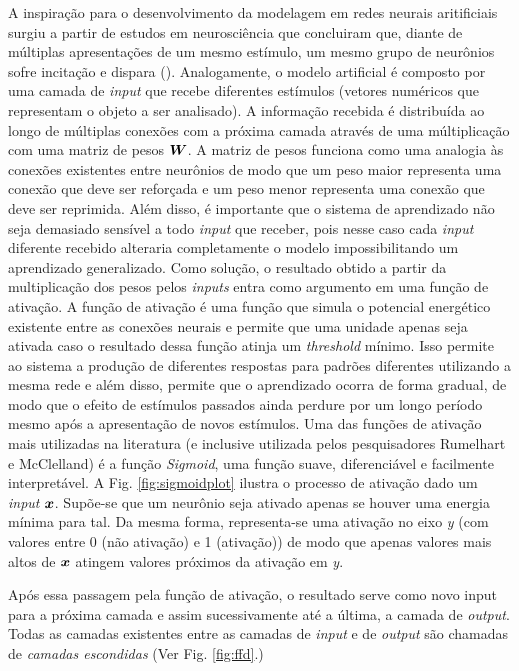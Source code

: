 A inspiração para o desenvolvimento da modelagem em redes neurais aritificiais surgiu a partir de estudos em neurosciência %
que concluiram que, diante de múltiplas apresentações de um mesmo estímulo, um mesmo grupo de neurônios sofre incitação e dispara (\cite{hubel:1962}).  Analogamente, o modelo artificial é composto por uma camada de \textit{input} que recebe diferentes estímulos (vetores numéricos que representam o objeto a ser analisado). A informação recebida é distribuída ao longo de múltiplas conexões com a próxima camada através de uma múltiplicação com uma matriz de pesos $\bm{W}$. A matriz de pesos funciona como uma analogia às conexões existentes entre neurônios de modo que um peso maior representa uma conexão que deve ser reforçada e um peso menor representa uma conexão que deve ser reprimida. Além disso, é importante que o sistema de aprendizado não seja demasiado sensível a todo \textit{input} que receber, pois nesse caso cada \textit{input} diferente recebido alteraria completamente o modelo impossibilitando um aprendizado generalizado. Como solução, o resultado obtido a partir da multiplicação dos pesos pelos \textit{inputs} entra como argumento em uma função de ativação. A função de ativação é uma função que simula o potencial energético existente entre as conexões neurais e permite que uma unidade apenas seja ativada caso o resultado dessa função atinja um \textit{threshold} mínimo. Isso permite ao sistema a produção de diferentes respostas para padrões diferentes utilizando a mesma rede e além disso, permite que o aprendizado ocorra de forma gradual, de modo que o efeito de estímulos passados ainda perdure por um longo período mesmo após a apresentação de novos estímulos. Uma das funções de ativação mais utilizadas na literatura (e inclusive utilizada pelos pesquisadores Rumelhart e McClelland) é a função \textit{Sigmoid}, uma função suave, diferenciável e facilmente interpretável. A Fig. \ref{fig:sigmoidplot} ilustra o processo de ativação dado um \textit{input} $\bm{x}$. Supõe-se que um neurônio seja ativado apenas se houver uma energia mínima para tal. Da mesma forma, representa-se uma ativação no eixo \textit{y} (com valores entre 0 (não ativação) e 1 (ativação)) de modo que apenas valores mais altos de $\bm{x}$ atingem valores próximos da ativação em \textit{y}.


Após essa passagem pela função de ativação, o resultado serve como novo input para a próxima camada e assim sucessivamente até a última, a camada de \textit{output}. Todas as camadas existentes entre as camadas de \textit{input} e de \textit{output} são chamadas de \textit{camadas escondidas} (Ver Fig. \ref{fig:ffd}.)


